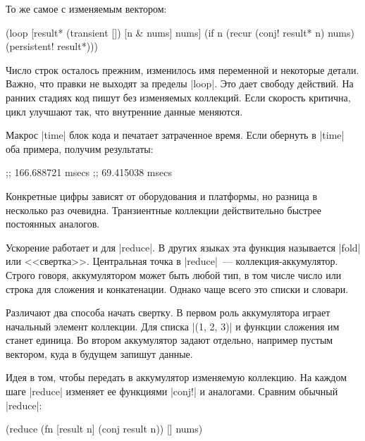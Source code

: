 \noindent
То же самое с изменяемым вектором:

\begin{english}
  \begin{clojure}
(loop [result* (transient [])
       [n & nums] nums]
  (if n
    (recur (conj! result* n) nums)
    (persistent! result*)))
  \end{clojure}
\end{english}

Число строк осталось прежним, изменилось имя переменной и некоторые
детали. Важно, что правки не выходят за пределы \spverb|loop|. Это дает свободу
действий. На ранних стадиях код пишут без изменяемых коллекций. Если скорость
критична, цикл улучшают так, что внутренние данные меняются.

Макрос \spverb|time| блок кода и печатает затраченное время. Если обернуть в
\spverb|time| оба примера, получим результаты:

\begin{english}
  \begin{text}
;; 166.688721 msecs
;;  69.415038 msecs
  \end{text}
\end{english}

Конкретные цифры зависят от оборудования и платформы, но разница в несколько раз
очевидна. Транзиентные коллекции действительно быстрее постоянных аналогов.

Ускорение работает и для \spverb|reduce|. В других языках эта функция называется
\spverb|fold| или <<свертка>>. Центральная точка в \spverb|reduce|~---
коллекция-аккумулятор. Строго говоря, аккумулятором может быть любой тип, в том
числе число или строка для сложения и конкатенации. Однако чаще всего это списки
и словари.

Различают два способа начать свертку. В первом роль аккумулятора играет
начальный элемент коллекции. Для списка \spverb|(1, 2, 3)| и функции сложения им
станет единица. Во втором аккумулятор задают отдельно, например пустым вектором,
куда в будущем запишут данные.

Идея в том, чтобы передать в аккумулятор изменяемую коллекцию. На каждом шаге
\spverb|reduce| изменяет ее функциями \spverb|conj!| и аналогами. Сравним
обычный \spverb|reduce|:

\begin{english}
  \begin{clojure}
(reduce
 (fn [result n]
   (conj result n))
 []
 nums)
  \end{clojure}
\end{english}

